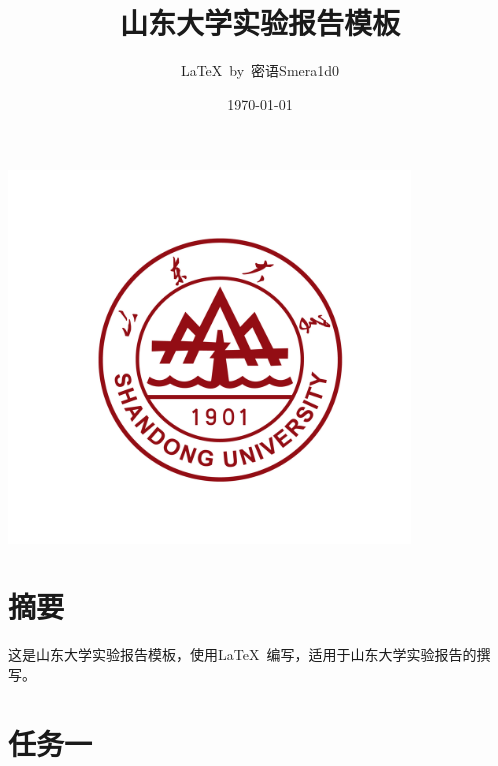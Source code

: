 \documentclass[UTF8]{ctexart}
\title{山东大学实验报告模板}
\author{\LaTeX\ by\ 密语Smera1d0}
\date{\today}
\begin{document}
\fancyhf{}
\fancyfoot[C]{\thepage}

\begin{titlingpage} %
    \centering
    \includegraphics[width=0.8\textwidth]{picture/logo2.jpg} %

    \vspace{1cm} %

    {\Huge \thetitle\par} %
    \vspace{1cm}
    {\Large \theauthor\par} %
    \vfill
    {\large \thedate\par} %
\end{titlingpage}

\newpage

\tableofcontents  %


\newpage
\section{摘要}
这是山东大学实验报告模板，使用\LaTeX\ 编写，适用于山东大学实验报告的撰写。

\section{任务一}
\end{document}
